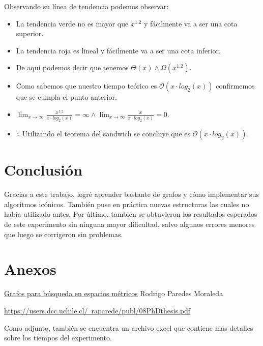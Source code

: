 \documentclass[letterpaper,11pt]{article}
\begin{document}
            Observando su línea de tendencia podemos observar:

            \begin{itemize}
                \item La tendencia verde no es mayor que $x^{1.2}$ y fácilmente va a ser una cota superior.
                \item La tendencia roja es lineal y fácilmente va a ser una cota inferior.
                \item De aquí podemos decir que tenemos $\Theta(x) \land \Omega(x^{1.2})$.
                \item Como sabemos que nuestro tiempo teórico es $\mathcal{O}(x\cdot log_2(x))$ confirmemos que se cumpla el punto anterior.
                \item $\lim_{x \to \infty} \frac{x^{1.2}}{x\cdot log_2(x)} = \infty \land \lim_{x \to \infty} \frac{x}{x\cdot log_2(x)} = 0$.
                \item $\therefore$ Utilizando el teorema del sandwich se concluye que es  $\mathcal{O}(x\cdot log_2(x))$.
            \end{itemize}
        
        \section{Conclusión}
            Gracias a este trabajo, logré aprender bastante de grafos y cómo implementar sus algoritmos icónicos. También puse en práctica nuevas estructuras las cuales no había utilizado antes.
            Por último, también se obtuvieron los resultados esperados de este experimento sin ninguna mayor dificultad, salvo algunos errores menores que luego se corrigeron sin problemas.

        \section{Anexos}
            \href{https://users.dcc.uchile.cl/~raparede/publ/08PhDthesis.pdf}{Grafos para búsqueda en espacios métricos} Rodrigo Paredes Moraleda 

            \href{https://users.dcc.uchile.cl/~raparede/publ/08PhDthesis.pdf}{https://users.dcc.uchile.cl/~raparede/publ/08PhDthesis.pdf}
            
            \bigskip
            Como adjunto, también se encuentra un archivo excel que contiene más detalles sobre los tiempos del experimento.

            
\end{document}
